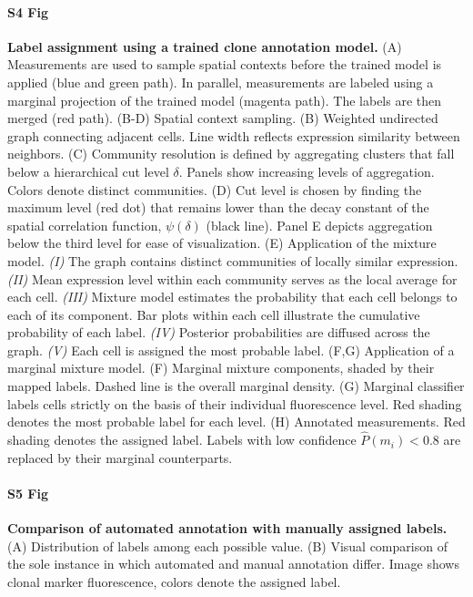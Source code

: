 \documentclass[10pt,letterpaper]{article}
\begin{document}
\paragraph*{S4 Fig}
\label{S4_Fig}
{\bf Label assignment using a trained clone annotation model.} (A) Measurements are used to sample spatial contexts before the trained model is applied (blue and green path). In parallel, measurements are labeled using a marginal projection of the trained model (magenta path). The labels are then merged (red path). (B-D) Spatial context sampling. (B) Weighted undirected graph connecting adjacent cells. Line width reflects expression similarity between neighbors. (C) Community resolution is defined by aggregating clusters that fall below a hierarchical cut level $\delta$. Panels show increasing levels of aggregation. Colors denote distinct communities. (D) Cut level is chosen by finding the maximum level (red dot) that remains lower than the decay constant of the spatial correlation function, $\psi(\delta)$ (black line). Panel E depicts aggregation below the third level for ease of visualization. (E) Application of the mixture model. \emph{(I)} The graph contains distinct communities of locally similar expression. \emph{(II)} Mean expression level within each community serves as the local average for each cell. \emph{(III)} Mixture model estimates the probability that each cell belongs to each of its component. Bar plots within each cell illustrate the cumulative probability of each label. \emph{(IV)} Posterior probabilities are diffused across the graph. \emph{(V)} Each cell is assigned the most probable label. (F,G) Application of a marginal mixture model. (F) Marginal mixture components, shaded by their mapped labels. Dashed line is the overall marginal density. (G) Marginal classifier labels cells strictly on the basis of their individual fluorescence level. Red shading denotes the most probable label for each level. (H) Annotated measurements. Red shading denotes the assigned label. Labels with low confidence $\hat{P}(m_i)<0.8$ are replaced by their marginal counterparts.

\paragraph*{S5 Fig}
\label{S5_Fig}
{\bf Comparison of automated annotation with manually assigned labels.} (A) Distribution of labels among each possible value. (B) Visual comparison of the sole instance in which automated and manual annotation differ. Image shows clonal marker fluorescence, colors denote the assigned label.
\end{document}
